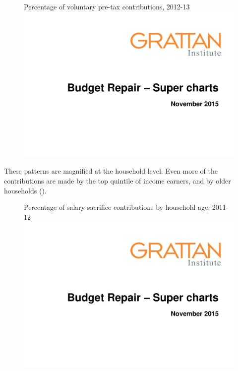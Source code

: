 \begin{subappendices}
\begin{figure}
%
{Percentage of voluntary pre-tax contributions, 2012-13}\label{fig:SUPER-A-2}
\includegraphics[width=\columnwidth,page=36]{super-atlas/PPTX.pdf}

\end{figure}

These patterns are magnified at the household level. Even more of the contributions are made by the top quintile of income earners, and by older households ().

\begin{figure}
%
{Percentage of salary sacrifice contributions by household age, 2011-12}\label{fig:SUPER-A-3}
\includegraphics[width=\columnwidth,page=37]{super-atlas/PPTX.pdf}


\end{figure}
\end{subappendices}
